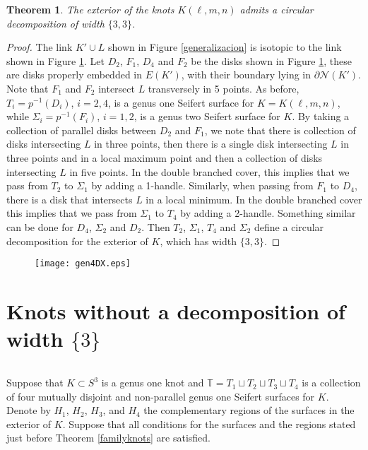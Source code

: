 \documentclass[12pt]{amsart}
\newtheorem{teo}{Theorem}
\begin{document}
\begin{teo} \label{familywidth}
The exterior of the knots $K(\ell,m,n)$ admits a circular decomposition of width $\{3,3\}$.
\end{teo}

\begin{proof} The link $K'\cup L$ shown in Figure \ref{generalizacion} is isotopic to the link shown in Figure \ref{generalizadoMorse}. Let $D_2$, $F_1$, $D_4$ and $F_2$ be the disks shown in Figure \ref{generalizadoMorse}, these are disks properly embedded in $E(K')$, with their boundary lying in $\partial \mathcal{N}(K')$. Note that $F_1$ and $F_2$ intersect $L$ transversely in 5 points. As before, $T_i=p^{-1}(D_i)$, $i=2,4$, is a genus one Seifert surface for $K=K(\ell,m,n)$, while $\Sigma_i=p^{-1}(F_i)$, $i=1,2$, is a genus two Seifert surface for $K$.
By taking a collection of parallel disks between $D_2$ and $F_1$, we note that there is  collection of disks intersecting $L$ in three points, then there is a single disk intersecting $L$ in three points and in a local maximum point and then a collection of disks intersecting $L$ in five points. In the double branched cover, this implies that we pass from $T_2$ to $\Sigma_1$ by adding a 1-handle. Similarly, when passing from $F_1$ to $D_4$, there is a disk that intersects $L$ in a local minimum. In the double branched cover this implies that we pass from $\Sigma_1$ to  $T_4$ by adding a 2-handle. Something similar can be done for $D_4$, $\Sigma_2$ and $D_2$. Then $T_2$, $\Sigma_1$, $T_4$ and $\Sigma_2$ define a circular decomposition for the exterior of $K$, which has width $\{ 3,3 \}$. \end{proof}

\begin{figure}
\begin{center}
\texttt{[image: gen4DX.eps]}    
\end{center}
\caption{}
\label{generalizadoMorse}

\end{figure}

\section{Knots without a decomposition of width $\{ 3 \}$}\label{width}
\(\)

Suppose that $K\subset S^3$ is a genus one knot and $\mathbb{T}=T_1\sqcup T_2\sqcup T_3\sqcup T_4$ is a collection of four mutually disjoint and non-parallel genus one Seifert surfaces for $K$. Denote by $H_1$,  $H_2$, $H_3$, and $H_4$ the complementary regions of the surfaces in the exterior of $K$. Suppose that all conditions for the surfaces and the regions stated just before Theorem \ref{familyknots} are satisfied.
\end{document}
